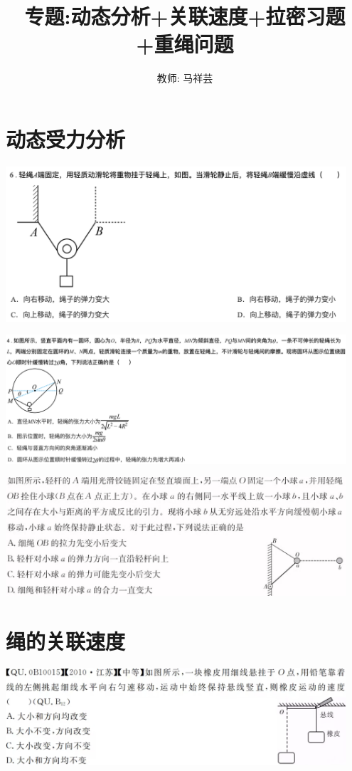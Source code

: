 \documentclass{article}
\title{专题:动态分析+关联速度+拉密习题+重绳问题}
\author{教师: 马祥芸}
\begin{document}
\maketitle
\tableofcontents
{}
\newpage


\section{动态受力分析}
\includegraphics[width = 0.95\textwidth]{./pictures/1-1.png}

\vspace{5em}

\includegraphics[width = 0.95\textwidth]{./pictures/1-2.png}

\vspace{5em}

\includegraphics[width = 0.95\textwidth]{./pictures/1-3.png}

\vspace{5em}

\section{绳的关联速度}
\includegraphics[width = 0.95\textwidth]{./pictures/2-1.png}
\end{document}
